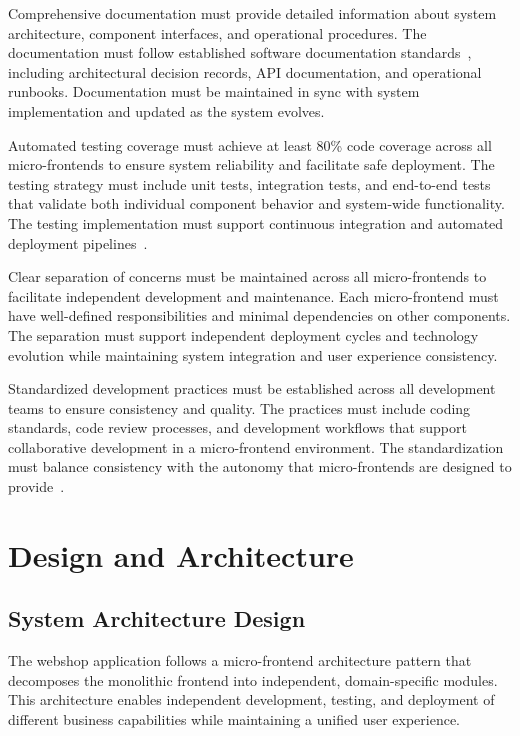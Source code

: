 \documentclass[12pt,a4paper]{report}
\begin{document}
Comprehensive documentation must provide detailed information about system architecture, component interfaces, and operational procedures. The documentation must follow established software documentation standards~\cite{ieee1998requirements}, including architectural decision records, API documentation, and operational runbooks. Documentation must be maintained in sync with system implementation and updated as the system evolves.

Automated testing coverage must achieve at least 80\% code coverage across all micro-frontends to ensure system reliability and facilitate safe deployment. The testing strategy must include unit tests, integration tests, and end-to-end tests that validate both individual component behavior and system-wide functionality. The testing implementation must support continuous integration and automated deployment pipelines~\cite{dustin2002automated}.

Clear separation of concerns must be maintained across all micro-frontends to facilitate independent development and maintenance. Each micro-frontend must have well-defined responsibilities and minimal dependencies on other components. The separation must support independent deployment cycles and technology evolution while maintaining system integration and user experience consistency.

Standardized development practices must be established across all development teams to ensure consistency and quality. The practices must include coding standards, code review processes, and development workflows that support collaborative development in a micro-frontend environment. The standardization must balance consistency with the autonomy that micro-frontends are designed to provide~\cite{fowler2018refactoring}.

\chapter{Design and Architecture}
\section{System Architecture Design}

The webshop application follows a micro-frontend architecture pattern that decomposes the monolithic frontend into independent, domain-specific modules. This architecture enables independent development, testing, and deployment of different business capabilities while maintaining a unified user experience.
\end{document}
